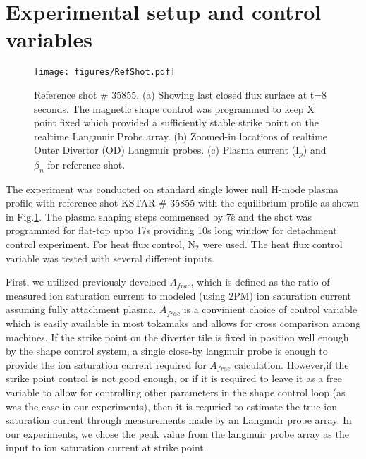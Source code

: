 \section{Experimental setup and control variables}
\label{sec:control_variables}

\begin{figure}[!ht]
 \centering
 \texttt{[image: figures/RefShot.pdf]}
 \caption{Reference shot \# 35855. (a) Showing last closed flux surface at t=8 seconds. The magnetic shape control was programmed to keep X point fixed which provided a sufficiently stable strike point on the realtime Langmuir Probe array. (b) Zoomed-in locations of realtime Outer Divertor (OD) Langmuir probes. (c) Plasma current (I$_p$) and $\beta_n$ for reference shot.}
 \label{fig:ref_shot}
\end{figure}

The experiment was conducted on standard single lower null H-mode plasma profile with reference shot KSTAR \# 35855 with the equilibrium profile as shown in Fig.\ref{fig:ref_shot}. The plasma shaping steps commensed by 7\~s and the shot was programmed for flat-top upto 17s providing 10s long window for detachment control experiment. For heat flux control, N$_2$  were used. The heat flux control variable was tested with several different inputs.

First, we utilized previously develoed $A_{frac}$\cite{Eldon_2022_PPCF}, which is defined as the ratio of measured ion saturation current to modeled (using 2PM\cite{Leonard_2018_PPCF}) ion saturation current assuming fully attachment plasma. $A_{frac}$ is a convinient choice of control variable which is easily available in most tokamaks and allows for cross comparison among machines. If the strike point on the diverter tile is fixed in position well enough by the shape control system, a single close-by langmuir probe is enough to provide the ion saturation current required for $A_{frac}$ calculation. However,if the strike point control is not good enough, or if it is required to leave it as a free variable to allow for controlling other parameters in the shape control loop (as was the case in our experiments), then it is requried to estimate the true ion saturation current through measurements made by an Langmuir probe array. In our experiments, we chose the peak value from the langmuir probe array as the input to ion saturation current at strike point.

